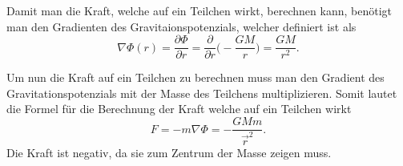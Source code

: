 Damit man die Kraft, welche auf ein Teilchen wirkt, berechnen kann, benötigt man den Gradienten des Gravitaionspotenzials, welcher definiert ist als
\begin{equation*}
	\nabla \Phi (r) = \frac{\partial \Phi}{\partial r} = \frac{\partial}{\partial r} \biggl( -\frac{GM}{r} \biggr) = \frac{GM}{r^2}.
\end{equation*}

Um nun die Kraft auf ein Teilchen zu berechnen muss man den Gradient des Gravitationspotenzials mit der Masse des Teilchens multiplizieren.
Somit lautet die Formel für die Berechnung der Kraft welche auf ein Teilchen wirkt
\begin{equation*}
	F = -m\nabla \Phi = -\frac{GMm}{\vec{r}^2}.
\end{equation*}
Die Kraft ist negativ, da sie zum Zentrum der Masse zeigen muss.



